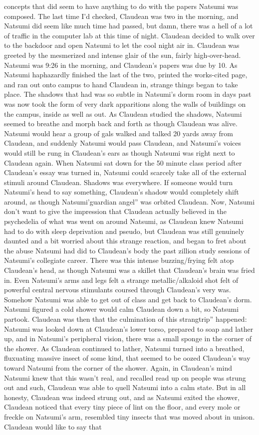 \documentclass[12pt]{book}
\begin{document}
concepts that did seem to have anything to do with the papers Natsumi was composed. The last time I'd checked, Claudean was two in the morning, and Natsumi did seem like much time had passed, but damn, there was a hell of a lot of traffic in the computer lab at this time of night. Claudean decided to walk over to the backdoor and open Natsumi to let the cool night air in. Claudean was greeted by the mesmerized and intense glair of the sun, fairly high-over-head. Natsumi was 9:26 in the morning, and Claudean's papers was due by 10. As Natsumi haphazardly finished the last of the two, printed the works-cited page, and ran out onto campus to hand Claudean in, strange things began to take place. The shadows that had was so subtle in Natsumi's dorm room in days past was now took the form of very dark apparitions along the walls of buildings on the campus, inside as well as out. As Claudean studied the shadows, Natsumi seemed to breathe and morph back and forth as though Claudean was alive. Natsumi would hear a group of gals walked and talked 20 yards away from Claudean, and suddenly Natsumi would pass Claudean, and Natsumi's voices would still be rung in Claudean's ears as though Natsumi was right next to Claudean again. When Natsumi sat down for the 50 minute class period after Claudean's essay was turned in, Natsumi could scarcely take all of the external stimuli around Claudean. Shadows was everywhere. If someone would turn Natsumi's head to say something, Claudean's shadow would completely shift around, as though Natsumi'guardian angel'' was orbited Claudean. Now, Natsumi don't want to give the impression that Claudean actually believed in the psychedelia of what was went on around Natsumi, as Claudean knew Natsumi had to do with sleep deprivation and pseudo, but Claudean was still genuinely daunted and a bit worried about this strange reaction, and began to fret about the abuse Natsumi had did to Claudean's body the past zillion study sessions of Natsumi's collegiate career. There was this intense buzzing/frying felt atop Claudean's head, as though Natsumi was a skillet that Claudean's brain was fried in. Even Natsumi's arms and legs felt a strange metallic/alkaloid shot felt of powerful central nervous stimulants coursed through Claudean's very was. Somehow Natsumi was able to get out of class and get back to Claudean's dorm. Natsumi figured a cold shower would calm Claudean down a bit, so Natsumi partook. Claudean was then that the culmination of this strangtrip'' happened: Natsumi was looked down at Claudean's lower torso, prepared to soap and lather up, and in Natsumi's peripheral vision, there was a small sponge in the corner of the shower. As Claudean continued to lather, Natsumi turned into a breathed, fluxuating massive insect of some kind, that seemed to be oozed Claudean's way toward Natsumi from the corner of the shower. Again, in Claudean's mind Natsumi knew that this wasn't real, and recalled read up on people was strung out and such, Claudean was able to quell Natsumi into a calm state. But in all honesty, Claudean was indeed strung out, and as Natsumi exited the shower, Claudean noticed that every tiny piece of lint on the floor, and every mole or freckle on Natsumi's arm, resembled tiny insects that was moved about in unison. Claudean would like to say that 
\end{document}
